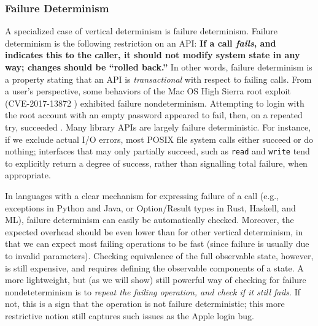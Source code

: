 \subsubsection{Failure Determinism}

A specialized case of vertical determinism is failure determinism.
Failure determinism is the following restriction on an API: {\bf If a call \emph{fails}, and indicates this to the caller, it should not modify system
  state in any way; changes should be ``rolled back.''}   In other words, failure determinism is a property stating that an API
is \emph{transactional} with respect to failing calls.  From a user's perspective, some behaviors of the Mac OS High Sierra
root exploit (CVE-2017-13872 \cite{applebug0}) exhibited failure
nondeterminism.  Attempting to login with the root account with an
empty password appeared to fail, then, on a repeated try, succeeded
\cite{applebug1,applebug2}.   Many library APIs are largely failure deterministic.  For instance, if
we exclude actual I/O errors, most POSIX file system calls either
succeed or do nothing; interfaces that may only partially succeed,
such as {\tt read} and {\tt write} tend to explicitly return a degree of success, rather than signalling total failure, when appropriate.  

In languages with a clear mechanism for expressing failure of a call
(e.g., exceptions in Python and Java, or Option/Result types in Rust,
Haskell, and ML), failure determinism can easily be automatically checked.
Moreover, the expected overhead should be even lower than for other vertical determinism, in that we can expect most failing
operations to be fast (since failure is usually
due to invalid parameters).  Checking equivalence of the full
observable state, however, is still expensive, and requires defining
the observable components of a state.  A more lightweight, but (as we
will show) still powerful way of checking for failure nondeteterminism is to
\emph{repeat the failing operation, and check if it still fails}.  If not,
this is a sign that the operation is not failure deterministic; this more restrictive notion still captures such issues as the Apple login bug. 

